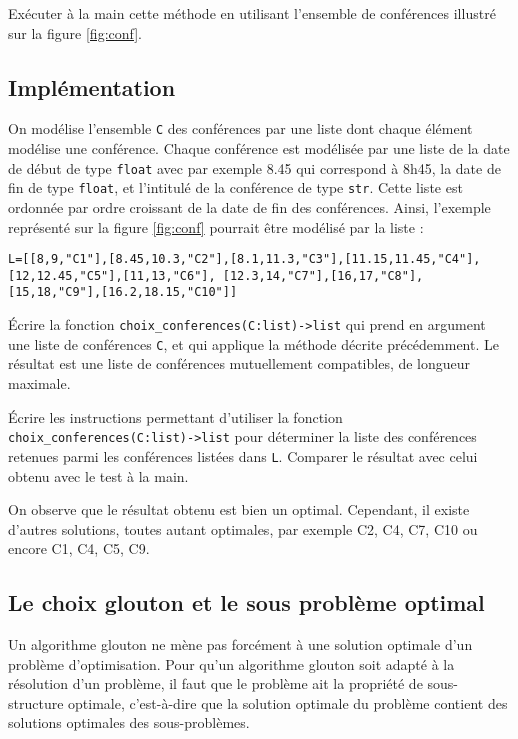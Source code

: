 \begin{question}
Exécuter à la main cette méthode en utilisant l'ensemble de conférences illustré sur la figure \ref{fig:conf}.
\end{question}

\subsection*{Implémentation}
\label{sec:Implémentation}

On modélise l'ensemble \lstinline{C} des conférences par une liste dont chaque élément modélise une conférence. Chaque conférence est modélisée par une liste de la date de début de type \lstinline{float} avec par exemple 8.45 qui correspond à 8h45, la date de fin de type \lstinline{float}, et l'intitulé de la conférence de type \lstinline{str}. Cette liste est ordonnée par ordre croissant de la date de fin des conférences. Ainsi, l'exemple représenté sur la figure \ref{fig:conf} pourrait être modélisé par la liste :

 

\lstinline{L=[[8,9,"C1"],[8.45,10.3,"C2"],[8.1,11.3,"C3"],[11.15,11.45,"C4"],[12,12.45,"C5"],[11,13,"C6"], [12.3,14,"C7"],[16,17,"C8"],[15,18,"C9"],[16.2,18.15,"C10"]]}


 

 

\begin{question}
\'Ecrire la fonction \lstinline{choix_conferences(C:list)->list} qui prend en argument une liste de conférences \lstinline{C}, et qui applique la méthode décrite précédemment. 
Le résultat est une liste de conférences mutuellement compatibles, de longueur maximale.
\end{question}

 


\begin{question}
\'Ecrire les instructions permettant d'utiliser la fonction \lstinline{choix_conferences(C:list)->list} pour déterminer la liste des conférences retenues parmi les conférences listées dans \lstinline{L}. Comparer le résultat avec celui obtenu avec le test à la main.
\end{question}

 

On observe que le résultat obtenu est bien un optimal. Cependant, il existe d'autres solutions, toutes autant optimales, par exemple C2, C4, C7, C10 ou encore C1, C4, C5, C9.

\subsection*{Le choix glouton et le sous problème optimal}
\label{sec:LeChoixGloutonEtLeSousProblèmeOptimal}
Un algorithme glouton ne mène pas forcément à une solution optimale d'un problème d'optimisation.
Pour qu'un algorithme glouton soit adapté à la résolution d'un problème, il faut que le problème ait la propriété de sous-structure optimale, c'est-à-dire que la solution optimale du problème contient des solutions optimales des sous-problèmes.

